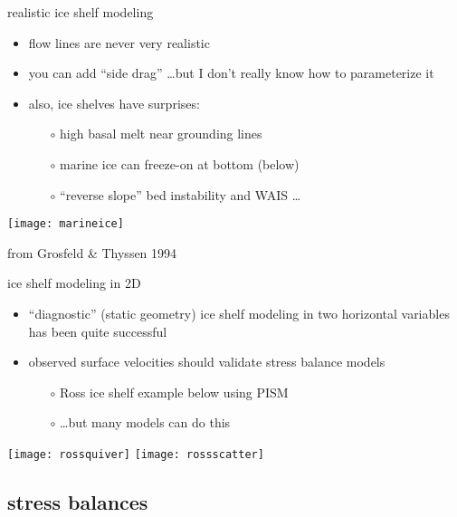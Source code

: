\begin{frame}{realistic ice shelf modeling}

\begin{itemize}
\item flow lines are never very realistic
\item you can add ``side drag'' \dots but I don't really know how to parameterize it
\item also, ice shelves have surprises:
  \begin{itemize}
  \item[$\circ$] high basal melt near grounding lines
  \item[$\circ$] marine ice can freeze-on at bottom (below)
  \item[$\circ$] ``reverse slope'' bed instability and WAIS \dots
  \end{itemize}
\end{itemize}

\medskip
\begin{center}
  \texttt{[image: marineice]}
  
  \medskip
  \tiny from Grosfeld \& Thyssen 1994
\end{center}
\end{frame}


\begin{frame}{ice shelf modeling in 2D}

\begin{itemize}
\item ``diagnostic'' (static geometry) ice shelf modeling in two horizontal variables has been quite successful
\item observed surface velocities should validate stress balance models
  \begin{itemize}
  \item[$\circ$] Ross ice shelf example below using PISM
  \item[$\circ$] \dots but many models can do this
  \end{itemize}
\end{itemize}

\begin{center}
  \texttt{[image: rossquiver]} \quad  \texttt{[image: rossscatter]}
\end{center}
\end{frame}


\subsection{stress balances}

